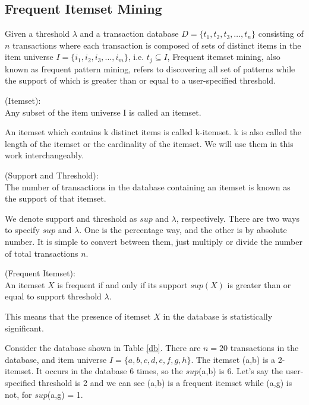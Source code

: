 \documentclass[conference]{IEEEtran}
\begin{document}
\subsection{Frequent Itemset Mining}
Given a threshold  $\lambda$ and a transaction database $D=\{t_1,t_2,t_3,\dots,t_n\}$ consisting of $n$ transactions where each transaction is composed of sets of distinct items in the item universe $I=\{i_1,i_2,i_3,\dots,i_m\}$, i.e. $t_j\subseteq I$,
Frequent itemset mining, also known as frequent pattern mining, refers to discovering all set of patterns while the support of which is greater than or equal to a user-specified threshold.

\begin{definition}{(Itemset):}\\
Any subset of the item universe I is called an itemset.
\end{definition}
An itemset which contains k distinct items is called k-itemset. k is also called the length of the itemset or the cardinality of the itemset. 
We will use them in this work interchangeably.


\begin{definition}{(Support and Threshold):}\label{defthreshold}\\
The number of transactions in the database containing an itemset is known as the support of that itemset.
\end{definition}\label{threshold}
We denote support and threshold as $sup$ and $\lambda$, respectively.
There are two ways to specify $sup$ and $\lambda$. One is the percentage way, and the other is by absolute number.
It is simple to convert between them, just multiply or divide the number of total transactions $n$.

\begin{definition}{(Frequent Itemset):}\\
An itemset $X$ is frequent if and only if its support $sup(X)$ is greater than or equal to support threshold $\lambda$.
\end{definition}
This means that the presence of itemset $X$ in the database is statistically significant.

\begin{example}\label{ex1}
    Consider the database shown in Table \ref{db}. There are $n=20$ transactions in the database, and item universe $I=\{a,b,c,d,e,f,g,h\}$.
    The itemset (a,b) is a 2-itemset. It occurs in the database 6 times, so the $sup$(a,b) is 6. 
    Let's say the user-specified threshold is 2 and we can see (a,b) is a frequent itemset while (a,g) is not, for $sup$(a,g) = 1.
\end{example}
\end{document}
